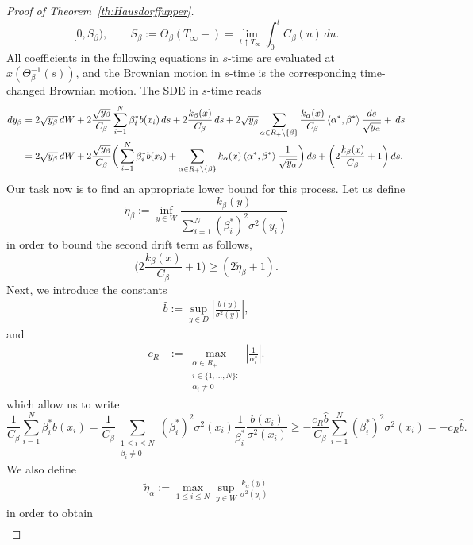 \documentclass{article}
\numberwithin{equation}{section}
\newcommand{\inner}[2]{\left<#1,#2\right>}
\newcommand{\aR}{\alpha\in R_+}
\newcommand{\SaRnb}{\sum_{\aR\backslash\{\beta\}}}
\newcommand{\Sni}{\sum_{i=1}^N}
\theoremstyle{plain}
\begin{document}
\begin{proof}[Proof of Theorem~\ref{th:Hausdorffupper}]
        \[
        [0,S_\beta),\qquad
        S_\beta:=\Theta_\beta(T_\infty-)
        =\lim_{t\uparrow T_\infty}\int_0^t C_\beta(u)\,du.
        \]
        All coefficients in the following equations in $s$-time are evaluated at $x(\Theta_\beta^{-1}(s))$, and the Brownian motion in $s$-time is the corresponding time-changed Brownian motion.
        The SDE in $s$-time reads
        \begin{align}
            dy_\beta &= 2\sqrt{y_\beta}\, dW+2\frac{\sqrt{y_\beta}}{C_\beta}\Sni\beta_i^*b(x_i)\, ds+2\frac{k_\beta(x)}{C_\beta}\, ds+2\sqrt{y_\beta}\SaRnb \frac{k_\alpha(x)}{C_\beta}\inner{\alpha^*}{\beta^*}\frac{ds}{\sqrt{y_\alpha}}+\, ds\notag\\
            &= 2\sqrt{y_\beta}\, dW+2\frac{\sqrt{y_\beta}}{C_\beta}\bigg(\Sni\beta_i^*b(x_i)+\SaRnb k_\alpha(x)\inner{\alpha^*}{\beta^*}\frac{1}{\sqrt{y_\alpha}}\bigg)\, ds +\bigg(2\frac{k_\beta(x)}{C_\beta}+1\bigg)\,ds.\label{eq:sqprojtobound}
        \end{align}
        Our task now is to find an appropriate lower bound for this process. Let us define
        \[\check{\eta}_\beta:=\inf_{y\in W}\frac{k_\beta(y)}{\Sni(\beta_i^*)^2\sigma^2(y_i)}\]
        in order to bound the second drift term as follows,
        \[\bigg(2\frac{k_\beta(x)}{C_\beta}+1\bigg)\geq(2\check\eta_\beta+1).\]
        Next, we introduce the constants
        \begin{align}
            \hat{b}:=\sup_{y\in D}\left|\frac{b(y)}{\sigma^2(y)}\right|,\label{eq:bhat}
        \end{align}
        and
	\begin{align}
			c_R&:=\max_{\substack{\alpha\in R_+\\i\in\{1,\ldots,N\}:\\\alpha_i\neq 0}}\left|\frac{1}{\alpha^*_i}\right|.\label{eq:constcr}
	\end{align}
        which allow us to write
        \[\frac{1}{C_\beta}\Sni\beta_i^*b(x_i)=\frac{1}{C_\beta}\sum_{\substack{1\leq i\leq N\\\beta_i\ne0}}(\beta_i^*)^2\sigma^2(x_i)\frac{1}{\beta_i^*}\frac{b(x_i)}{\sigma^2(x_i)}\geq -\frac{c_R\hat{b}}{C_\beta}\Sni(\beta_i^*)^2\sigma^2(x_i)=-c_R\hat{b}.\]
        We also define
        \begin{align}
            \tilde{\eta}_\alpha:=\max_{1\leq i\leq N}\sup_{y\in W}\frac{k_\alpha(y)}{\sigma^2(y_i)}\label{eq:etatilde}
        \end{align}
        in order to obtain
        \begin{align*}

\end{align*}
\end{proof}
\end{document}
